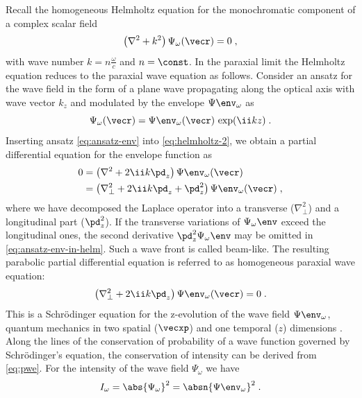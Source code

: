 \documentclass[
twoside,
openright,
titlepage,
numbers=noenddot,
headinclude,
fleqn,
a4paper,
footinclude=true,
cleardoublepage=empty,
abstractoff,
BCOR=5mm,
paper=a4,
fontsize=11pt,
british,ngerman,american,
]{scrreprt}
\begin{document}
Recall the homogeneous Helmholtz equation for the monochromatic
component of a complex scalar field
\begin{equation}
  \label{eq:helmholtz-2}
  \left(\nabla^2 + k^2\right)\Psi_\omega(\vecr)=0\;,
\end{equation}
with wave number $k=n\frac{\omega}{c}$ and $n=\const$.  In the
paraxial limit the Helmholtz equation reduces to the paraxial wave
equation as follows.  Consider an ansatz for the wave field in the
form of a plane wave propagating along the optical axis with wave
vector $k_z$ and modulated by the envelope $\Psi\env_{\omega}$ as
\begin{equation}
  \label{eq:ansatz-env}
  \Psi_{\omega}(\vecr)=\Psi\env_{\omega}(\vecr)\,\exp(\ii k z)\;.
\end{equation}
Inserting ansatz \eqref{eq:ansatz-env} into \cref{eq:helmholtz-2}, we
obtain a partial differential equation for the envelope function as
\begin{equation}
  \label{eq:ansatz-env-in-helm}
  \begin{split}
    0&=\left(\nabla^2 +2\ii k\pd_z\right)\Psi\env_{\omega}(\vecr)\\
    &=\left(\nabla_\perp^2+2\ii k\pd_z+\pd_z^2\right)
    \Psi\env_{\omega}(\vecr)\;,
  \end{split}
\end{equation}
where we have decomposed the Laplace operator into a transverse
($\nabla_\perp^2$) and a longitudinal part ($\pd_z^2$).  If the
transverse variations of $\Psi_\omega\env$ exceed the longitudinal
ones, the second derivative $\pd_z^2\Psi_{\omega}\env$ may be omitted
in \cref{eq:ansatz-env-in-helm}.  Such a wave front is called
beam-like.  The resulting parabolic partial differential equation is
referred to as homogeneous paraxial wave equation:
\begin{equation}
  \label{eq:pwe}
  \left(\nabla_\perp^2 +2\ii k\pd_z\right)\Psi\env_{\omega}(\vecr) = 0 \;.
\end{equation}
This is a Schrödinger equation for the z-evolution of the wave field
$\Psi\env_{\omega}$, \ie{} quantum mechanics in two spatial ($\vecxp$)
and one temporal ($z$) dimensions \cite{Schroedinger1926}.  Along the
lines of the conservation of probability of a wave function governed
by Schrödinger's equation, the conservation of intensity can be
derived from \cref{eq:pwe}.  For the intensity of the wave field
$\Psi_\omega$ we have
\begin{equation}
  \label{eq:intensity-fresnel}
  I_\omega = \abs{\Psi_\omega}^2 = \absn{\Psi\env_\omega}^2 \;.
\end{equation}
\end{document}
